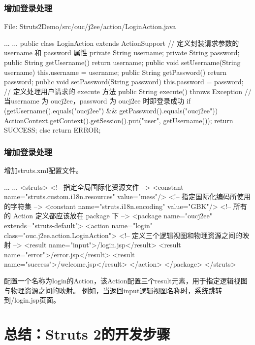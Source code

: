 \begin{frame}[fragile] %
\frametitle{增加登录处理}

File: Struts2Demo/src/ouc/j2ee/action/LoginAction.java

\begin{javaCode}
... ...
public class LoginAction extends ActionSupport {
  // 定义封装请求参数的 username 和 password 属性
  private String username;
  private String password;
  public String getUsername() {
    return username;
  }
  public void setUsername(String username) {
    this.username = username;
  }
  public String getPassword() {
    return password;
  }
  public void setPassword(String password) {
    this.password = password;
  }
  // 定义处理用户请求的 execute 方法
  public String execute() throws Exception {
    // 当username 为 oucj2ee，password 为 oucj2ee 时即登录成功
    if (getUsername().equals("oucj2ee") && getPassword().equals("oucj2ee")) {
      ActionContext.getContext().getSession().put("user", getUsername());
      return SUCCESS;
    } else {
      return ERROR;
    }
  }
}
\end{javaCode}
\end{frame}

\begin{frame}[fragile] %
\frametitle{增加登录处理}

增加struts.xml配置文件。
\begin{xmlCode}
... ...
<struts>
  <!-- 指定全局国际化资源文件 -->
  <constant name="struts.custom.i18n.resources" value="mess"/>
  <!-- 指定国际化编码所使用的字符集 -->	
  <constant name="struts.i18n.encoding" value="GBK"/>
  <!-- 所有的 Action 定义都应该放在 package 下 -->
  <package name="oucj2ee" extends="struts-default">
    <action name="login" class="ouc.j2ee.action.LoginAction">
    <!-- 定义三个逻辑视图和物理资源之间的映射 -->		
      <result name="input">/login.jsp</result>
      <result name="error">/error.jsp</result>
      <result name="success">/welcome.jsp</result>
    </action>
  </package>
</struts>
\end{xmlCode}
配置一个名称为login的Action，该Action配置三个result元素，用于指定逻辑视图与物理资源之间的映射。
例如，当返回input逻辑视图名称时，系统跳转到/login.jsp页面。
\end{frame}

\section{总结：Struts 2的开发步骤}

